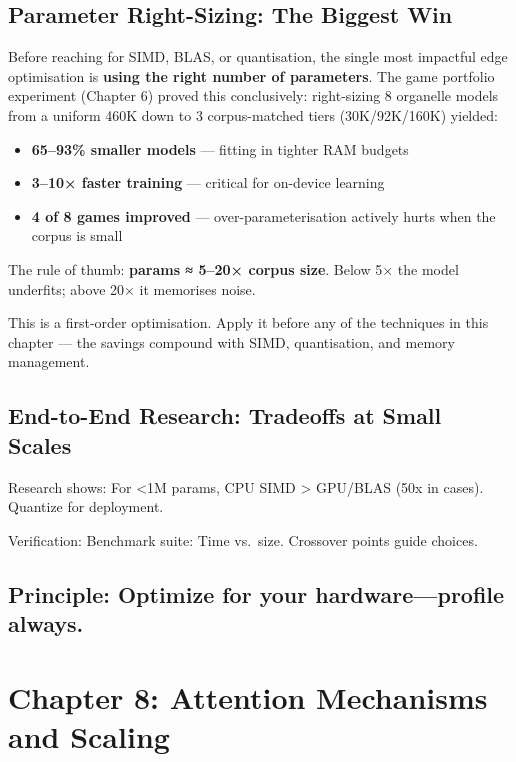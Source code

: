 \documentclass[
]{article}
\providecommand{\tightlist}{%
  \setlength{\itemsep}{0pt}\setlength{\parskip}{0pt}}
\begin{document}
\subsection{Parameter Right-Sizing: The Biggest
Win}\label{parameter-right-sizing-the-biggest-win}

Before reaching for SIMD, BLAS, or quantisation, the single most
impactful edge optimisation is \textbf{using the right number of
parameters}. The game portfolio experiment (Chapter 6) proved this
conclusively: right-sizing 8 organelle models from a uniform 460K down
to 3 corpus-matched tiers (30K/92K/160K) yielded:

\begin{itemize}
\tightlist
\item
  \textbf{65--93\% smaller models} --- fitting in tighter RAM budgets
\item
  \textbf{3--10× faster training} --- critical for on-device learning
\item
  \textbf{4 of 8 games improved} --- over-parameterisation actively
  hurts when the corpus is small
\end{itemize}

The rule of thumb: \textbf{params ≈ 5--20× corpus size}. Below 5× the
model underfits; above 20× it memorises noise.

This is a first-order optimisation. Apply it before any of the
techniques in this chapter --- the savings compound with SIMD,
quantisation, and memory management.

\subsection{End-to-End Research: Tradeoffs at Small
Scales}\label{end-to-end-research-tradeoffs-at-small-scales}

Research shows: For \textless1M params, CPU SIMD \textgreater{} GPU/BLAS
(50x in cases). Quantize for deployment.

Verification: Benchmark suite: Time vs.~size. Crossover points guide
choices.

\subsection{Principle: Optimize for your hardware---profile
always.}\label{principle-optimize-for-your-hardwareprofile-always.}

\section{Chapter 8: Attention Mechanisms and
Scaling}\label{chapter-8-attention-mechanisms-and-scaling}
\end{document}
